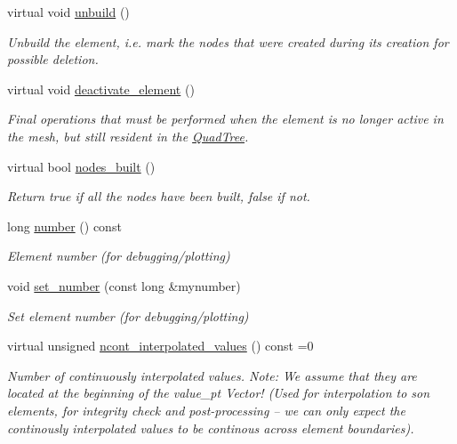 \begin{DoxyCompactItemize}
virtual void \hyperlink{classoomph_1_1RefineableElement_a46448576f1938e3c50ca10b9fc849c8b}{unbuild} ()
\begin{DoxyCompactList}\small\item\em Unbuild the element, i.\+e. mark the nodes that were created during its creation for possible deletion. \end{DoxyCompactList}\item 
virtual void \hyperlink{classoomph_1_1RefineableElement_a4931ee06e1f064f286eed647483475b3}{deactivate\+\_\+element} ()
\begin{DoxyCompactList}\small\item\em Final operations that must be performed when the element is no longer active in the mesh, but still resident in the \hyperlink{classoomph_1_1QuadTree}{Quad\+Tree}. \end{DoxyCompactList}\item 
virtual bool \hyperlink{classoomph_1_1RefineableElement_a50758228db823d72ea8da23dbb000901}{nodes\+\_\+built} ()
\begin{DoxyCompactList}\small\item\em Return true if all the nodes have been built, false if not. \end{DoxyCompactList}\item 
long \hyperlink{classoomph_1_1RefineableElement_a49698dae92649ebf102dfb4359d7b0bf}{number} () const
\begin{DoxyCompactList}\small\item\em Element number (for debugging/plotting) \end{DoxyCompactList}\item 
void \hyperlink{classoomph_1_1RefineableElement_a01c12f1b800cfc4176bf218bb73c7f14}{set\+\_\+number} (const long \&mynumber)
\begin{DoxyCompactList}\small\item\em Set element number (for debugging/plotting) \end{DoxyCompactList}\item 
virtual unsigned \hyperlink{classoomph_1_1RefineableElement_a53e171a18c9f43f1db90a6876516a073}{ncont\+\_\+interpolated\+\_\+values} () const =0
\begin{DoxyCompactList}\small\item\em Number of continuously interpolated values. Note\+: We assume that they are located at the beginning of the value\+\_\+pt Vector! (Used for interpolation to son elements, for integrity check and post-\/processing -- we can only expect the continously interpolated values to be continous across element boundaries). \end{DoxyCompactList}\item 

\end{DoxyCompactItemize}
